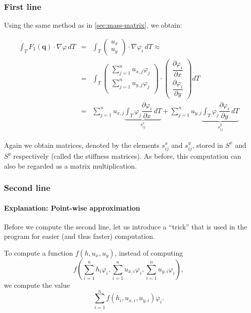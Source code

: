 \documentclass{article}
\newcommand{\pd}[2]{\dfrac{\partial #1}{\partial #2}}
\renewcommand{\phi}{\varphi}
\begin{document}
\subsubsection{First line}
\label{sec:stiffness-matrix-first-line}

Using the same method as in \ref{sec:mass-matrix}, we obtain:

\begin{eqnarray*}
  \int_T F_1(\mathbf{q}) \cdot \nabla \phi \, dT & = &
  \int_T
  \begin{pmatrix}
    u_x \\ u_y
  \end{pmatrix}
  \cdot \nabla \phi_i \, dT \approx \\
  &=& \int_T
  \begin{pmatrix}
    \sum_{j=1}^n u_{x,j} \phi_j \\
    \sum_{j=1}^n u_{y,j} \phi_j \\
  \end{pmatrix}
  \cdot
  \begin{pmatrix}
    \pd{\phi_i}{x} \\
    \pd{\phi_i}{y}
  \end{pmatrix} dT \\
  & = & \sum_{j=1}^n u_{x,j} \underbrace{\int_T \phi_j \pd{\phi_i}{x} \, dT}_{s_{ij}^x} + \sum_{j=1}^n u_{y,j} \underbrace{\int_T \phi_j \pd{\phi_i}{y} \, dT}_{s_{ij}^y}
\end{eqnarray*}

Again we obtain matrices, denoted by the elements $s_{ij}^x$ and $s_{ij}^y$, stored in $S^x$ and $S^y$ respectively (called the stiffness matrices). As before, this computation can also be regarded as a matrix multiplication.

\subsubsection{Second line}
\label{sec:stiffness-second-line}

\paragraph{Explanation: Point-wise approximation}

Before we compute the second line, let us introduce a ``trick'' that is used in the program for easier (and thus faster) computation.

To compute a function $f(h, u_x, u_y)$, instead of computing
\begin{equation*}
  f\left(\sum_{i=1}^n h_i \phi_i,
    \sum_{i=1}^n u_{x,i} \phi_i,
    \sum_{i=1}^n u_{y,i} \phi_i\right),
\end{equation*}
we compute the value
\begin{equation*}
  \sum_{i=1}^n f(h_i,u_{x,i},u_{y,i}) \phi_i.
\end{equation*}
\end{document}
